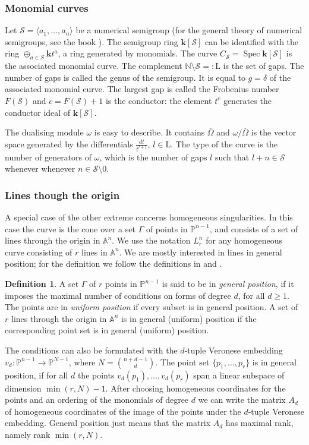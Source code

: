 \documentclass{amsart}
\renewcommand{\P}{\mathbb{P}}
\newcommand{\N}{\mathbb{N}}
\newcommand{\A}{\mathbb{A}}
\renewcommand{\S}{\mathcal S}
\renewcommand{\L}{\mathrm L}
\renewcommand{\k}{\mathbf{k}} %
\DeclareMathOperator{\Spec}{Spec}
\renewcommand{\ell}{l}
\theoremstyle{definition}
\newtheorem{defn}[thm]{Definition}
\theoremstyle{remark}
\begin{document}
\subsubsection{Monomial curves}
Let $\S=\langle a_1,\dots,a_n\rangle$ be a numerical semigroup  
(for the general theory of numerical semigroups, see the book \cite{RG}).
The semigroup ring
$\k[\S]$ can be identified with the ring $\oplus_{a\in S} \k t^a$, a ring generated by monomials.
The curve $C_\S=\Spec \k[\S]$ is the associated monomial curve.
The complement $\N\setminus \S=:\L$ is the set of gaps. The number of gaps is called the
genus of the semigroup. It is equal to $g=\delta$ of the associated monomial curve.
The largest gap is called the Frobenius number $F(\S)$ and $c=F(\S)+1$ is the conductor:
the element $t^c$ generates the conductor ideal of $\k[\S]$.


The dualising module $\omega$ is easy to describe. It contains $\overline \Omega$
and $\omega/\overline\Omega$ is the vector space generated by the differentials
$\frac {dt}{t^{\ell+1}}$, $\ell\in\L$. The type of the curve is the number of generators 
of $\omega$, which is the number of gaps $\ell$  such that $\ell+n\in \S$ whenever
whenever $n\in \S\setminus 0$.


\subsubsection{Lines though the origin}\label{sssc:lines}
A special case of the
other extreme concerns homogeneous singularities. In this case the curve
is the cone over a set $\Gamma$ of points in $\P^{n-1}$, and consists of a set of lines
through the origin in  $\A^n$. We use the notation $L_r^n$ for any homogeneous  curve 
consisting of $r$ lines in  $\A^n$.  We are mostly interested in lines in general
position; 
for the definition  we follow the definitions in
\cite{Gr} and \cite{GO}.
\begin{defn}
A set $\Gamma$ of $r$ points in $\P^{n-1}$ is said to be in \textit{general position}, if
it imposes the  maximal number of conditions on forms of degree $d$, for all $d\geq 1$.
The points are in \textit{uniform position} if  every subset is in general position. 
A set of $r$ lines through the origin in $\A^n$ is in general  (uniform) position
if  the corresponding point set is in  general (uniform) position.
\end{defn}

The conditions can also be formulated  with the $d$-tuple Veronese embedding
$v_d\colon \P^{n-1} \to \P^{N-1}$, where $N=\binom{n+d-1}d$.
The point set $\{p_1,\dots,p_r\}$ is in general position, if for all $d$ the points 
$v_d(p_1),\dots,v_d(p_r)$ span a  linear subspace of dimension $\min(r,N)-1$.
After choosing homogeneous coordinates  for the points and an  ordering of the monomials
of degree $d$ we can write the matrix $A_d$ of homogeneous coordinates of the image
of the points under the  $d$-tuple Veronese embedding. General position just means that the
matrix $A_d$ has maximal rank, namely rank  $\min(r,N)$.
\end{document}

